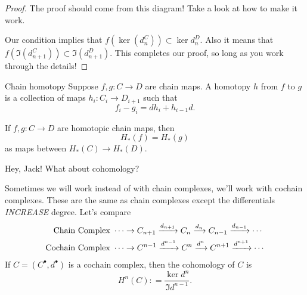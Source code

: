 \begin{proof}The proof should come from this diagram! Take a look at how to make  it work. 
    \begin{center}
    \end{center}
    Our condition implies that $f(\ker(d_n^C))\subset \ker d_n^D$. Also it means that $f(\Im(d_{n+1}^C))\subset \Im(d_{n+1}^D)$. This completes our proof, so long as you work through the details!
\end{proof}

\begin{definition}{Chain homotopy}{}
    Suppose $f,g:C\to D$ are chain maps. A {homotopy} $h$ from $f$ to $g$ is a collection of maps $h_i:C_i\to D_{i+1}$ such that $$f_i - g_i = d h_i + h_{i-1} d.$$
\end{definition}

\begin{fact}{}{}
    If $f,g:C\to D$ are homotopic chain maps, then $$H_\ast(f) = H_\ast(g)$$ as maps between $H_\ast(C)\to H_\ast(D)$. 

\end{fact}

Hey, Jack! What about cohomology?

\begin{remark}{}{}
    Sometimes we will work instead of with chain complexes, we'll work with {cochain complexes}. These are the same as chain complexes except the differentials \emph{INCREASE} degree. Let's compare
    \begin{align*}
        \text{Chain Complex }& \cdots \to C_{n+1}\xrightarrow{d_{n+1}}C_n\xrightarrow{d_n}C_{n-1}\xrightarrow{d_{n-1}}\cdots\\
        \text{Cochain Complex }& \cdots \to C^{n-1}\xrightarrow{d^{n-1}}C^n\xrightarrow{d^n}C^{n+1}\xrightarrow{d^{n+1}}\cdots\\
    \end{align*}
    If $C = (C^\bullet, d^\bullet)$ is a cochain complex, then the cohomology of $C$ is $$H^n(C): = \frac{\ker d^n}{\Im d^{n-1}}.$$
\end{remark}


